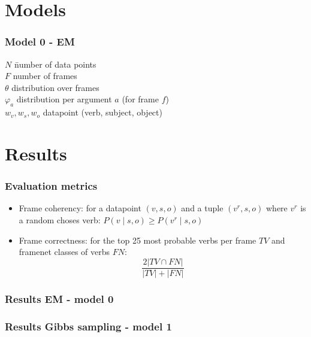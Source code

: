 \documentclass{beamer}
\begin{document}
\section{Models}
\begin{frame}
  \frametitle{Model 0 - EM }
\begin{tabbing}
  $N$ \hspace{64pt}\= number of data points\\
  $F$\> number of frames\\
  $\theta$\> distribution over frames\\
  $\varphi_a$ \> distribution per argument $a$ (for frame $f$)\\
  $w_v,w_s,w_o$\> datapoint (verb, subject, object)\\
\end{tabbing}
\end{frame}

\section{Results}
\begin{frame}
  \frametitle{Evaluation metrics}
  \begin{itemize}
  \item Frame coherency: for a datapoint $(v,s,o)$ and a tuple $(v^r,s,o)$ where $v^r$ is a random choses verb: $P(v\mid s,o) \geq P(v^r\mid s,o)$  
  \item Frame correctness: for the top 25 most probable verbs per frame $TV$ and framenet classes of verbs $FN$: \[\frac{2|TV\cap FN|}{|TV|+|FN|}\]
  \end{itemize}
\end{frame}

\begin{frame}
  \frametitle{Results EM - model 0}
\end{frame}

\begin{frame}
  \frametitle{Results Gibbs sampling - model 1}
\end{frame}
\end{document}
